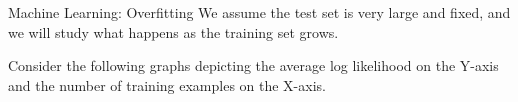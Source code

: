 \begin{problem}[10]{Machine Learning: Overfitting}
We assume the test set is very large and fixed, and we will study what happens as the training set grows.

Consider the following graphs depicting the average log likelihood on the Y-axis and the number of training examples on the X-axis.
\vspace{-0.5cm}
\begin{figure}[H]
 \hfill
{} \hfill
\centering {} \hfill \\
 \hfill
{} \hfill
\centering {} \hfill \\
\end{figure}


\end{problem}
